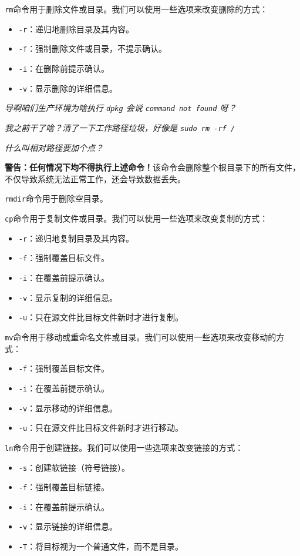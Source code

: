 \documentclass[../main.tex]{subfiles}
\begin{document}
\texttt{rm}命令用于删除文件或目录。我们可以使用一些选项来改变删除的方式：
\begin{itemize}
  \item \texttt{-r}：递归地删除目录及其内容。
  \item \texttt{-f}：强制删除文件或目录，不提示确认。
  \item \texttt{-i}：在删除前提示确认。
  \item \texttt{-v}：显示删除的详细信息。
\end{itemize}

\begin{tcolorbox}[title=笑话]

\emph{导啊咱们生产环境为啥执行 \texttt{dpkg} 会说 \texttt{command not found} 呀？}

\emph{我之前干了啥？清了一下工作路径垃圾，好像是 \texttt{sudo rm -rf /}}

\emph{什么叫相对路径要加个点？}

{\color{red}\textbf{警告：任何情况下均不得执行上述命令！}}该命令会删除整个根目录下的所有文件，不仅导致系统无法正常工作，还会导致数据丢失。

\end{tcolorbox}

\texttt{rmdir}命令用于删除空目录。

\texttt{cp}命令用于复制文件或目录。我们可以使用一些选项来改变复制的方式：
\begin{itemize}
  \item \texttt{-r}：递归地复制目录及其内容。
  \item \texttt{-f}：强制覆盖目标文件。
  \item \texttt{-i}：在覆盖前提示确认。
  \item \texttt{-v}：显示复制的详细信息。
  \item \texttt{-u}：只在源文件比目标文件新时才进行复制。
\end{itemize}

\texttt{mv}命令用于移动或重命名文件或目录。我们可以使用一些选项来改变移动的方式：
\begin{itemize}
  \item \texttt{-f}：强制覆盖目标文件。
  \item \texttt{-i}：在覆盖前提示确认。
  \item \texttt{-v}：显示移动的详细信息。
  \item \texttt{-u}：只在源文件比目标文件新时才进行移动。
\end{itemize}

\texttt{ln}命令用于创建链接。我们可以使用一些选项来改变链接的方式：
\begin{itemize}
  \item \texttt{-s}：创建软链接（符号链接）。
  \item \texttt{-f}：强制覆盖目标链接。
  \item \texttt{-i}：在覆盖前提示确认。
  \item \texttt{-v}：显示链接的详细信息。
  \item \texttt{-T}：将目标视为一个普通文件，而不是目录。
\end{itemize}
\end{document}
